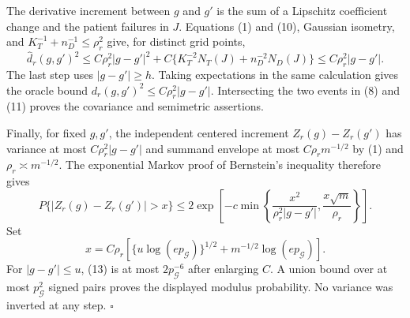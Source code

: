The derivative increment between \(g\) and \(g'\) is the sum of a Lipschitz coefficient change and the patient failures in \(J\). Equations (1) and (10), Gaussian isometry, and \(K_T^{-1}+n_D^{-1}\le\rho_r^2\) give, for distinct grid points,
\[
 \widehat d_r(g,g')^2
 \le C\rho_r^2|g-g'|^2
 +C\{K_T^{-2}N_T(J)+n_D^{-2}N_D(J)\}
 \le C\rho_r^2|g-g'|.                                    \tag{12}
\]
The last step uses \(|g-g'|\ge h\). Taking expectations in the same calculation gives the oracle bound \(d_r(g,g')^2\le C\rho_r^2|g-g'|\). Intersecting the two events in (8) and (11) proves the covariance and semimetric assertions.

Finally, for fixed \(g,g'\), the independent centered increment \(Z_r(g)-Z_r(g')\) has variance at most \(C\rho_r^2|g-g'|\) and summand envelope at most \(C\rho_r m^{-1/2}\) by (1) and \(\rho_r\asymp m^{-1/2}\). The exponential Markov proof of Bernstein's inequality therefore gives
\[
 P\{|Z_r(g)-Z_r(g')|>x\}
 \le2\exp\left[-c\min\left\{
 \frac{x^2}{\rho_r^2|g-g'|},
 \frac{x\sqrt m}{\rho_r}\right\}\right].               \tag{13}
\]
Set
\[
 x=C\rho_r\left[\{u\log(e p_{\mathcal G})\}^{1/2}
 +m^{-1/2}\log(e p_{\mathcal G})\right].
\]
For \(|g-g'|\le u\), (13) is at most \(2p_{\mathcal G}^{-6}\) after enlarging \(C\). A union bound over at most \(p_{\mathcal G}^2\) signed pairs proves the displayed modulus probability. No variance was inverted at any step. \(\square\)